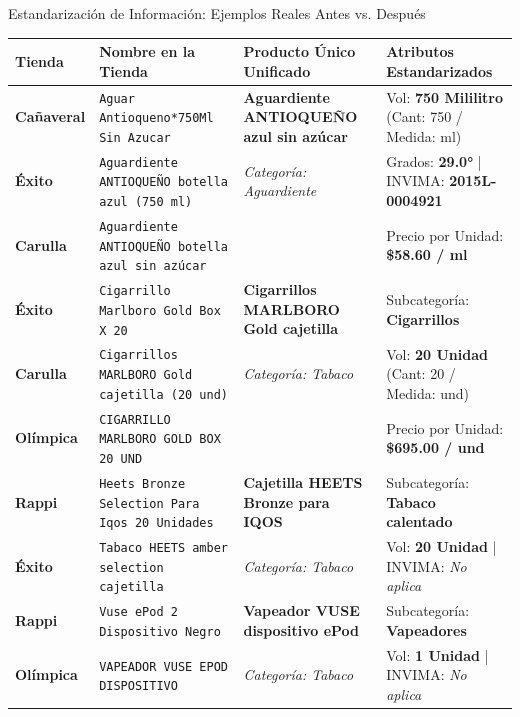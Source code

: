 \documentclass[aspectratio=169, 10pt]{beamer}
\begin{document}
\begin{frame}{Estandarización de Información: Ejemplos Reales Antes vs. Después}
    \vspace{-0.2cm}
    \scriptsize
    \begin{table}[h]
        \centering
        \begin{tabular}{p{2.3cm}p{4.2cm}p{4.2cm}p{3.2cm}}
            \toprule
            \textbf{Tienda} & \textbf{Nombre en la Tienda} & \textbf{Producto Único Unificado} & \textbf{Atributos Estandarizados} \\
            \midrule
            \textbf{Cañaveral} & \texttt{Aguar Antioqueno*750Ml Sin Azucar} & \textbf{Aguardiente ANTIOQUEÑO azul sin azúcar} & Vol: \textbf{750 Mililitro} (Cant: 750 / Medida: ml) \\
            \textbf{Éxito} & \texttt{Aguardiente ANTIOQUEÑO botella azul (750 ml)} & \textit{Categoría: Aguardiente} & Grados: \textbf{29.0°} | INVIMA: \textbf{2015L-0004921} \\
            \textbf{Carulla} & \texttt{Aguardiente ANTIOQUEÑO botella azul sin azúcar} & & Precio por Unidad: \textbf{\$58.60 / ml} \\
            \midrule
            \textbf{Éxito} & \texttt{Cigarrillo Marlboro Gold Box X 20} & \textbf{Cigarrillos MARLBORO Gold cajetilla} & Subcategoría: \textbf{Cigarrillos} \\
            \textbf{Carulla} & \texttt{Cigarrillos MARLBORO Gold cajetilla (20 und)} & \textit{Categoría: Tabaco} & Vol: \textbf{20 Unidad} (Cant: 20 / Medida: und) \\
            \textbf{Olímpica} & \texttt{CIGARRILLO MARLBORO GOLD BOX 20 UND} & & Precio por Unidad: \textbf{\$695.00 / und} \\
            \midrule
            \textbf{Rappi} & \texttt{Heets Bronze Selection Para Iqos 20 Unidades} & \textbf{Cajetilla HEETS Bronze para IQOS} & Subcategoría: \textbf{Tabaco calentado} \\
            \textbf{Éxito} & \texttt{Tabaco HEETS amber selection cajetilla} & \textit{Categoría: Tabaco} & Vol: \textbf{20 Unidad} | INVIMA: \textit{No aplica} \\
            \midrule
            \textbf{Rappi} & \texttt{Vuse ePod 2 Dispositivo Negro} & \textbf{Vapeador VUSE dispositivo ePod} & Subcategoría: \textbf{Vapeadores} \\
            \textbf{Olímpica} & \texttt{VAPEADOR VUSE EPOD DISPOSITIVO} & \textit{Categoría: Tabaco} & Vol: \textbf{1 Unidad} | INVIMA: \textit{No aplica} \\
            \bottomrule
        \end{tabular}
    \end{table}
\end{frame}
\end{document}
